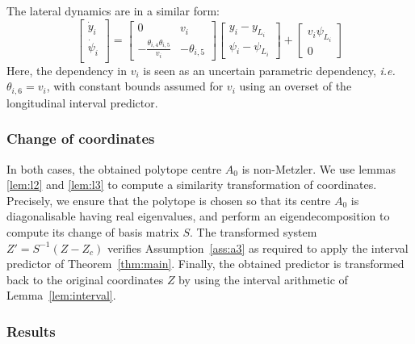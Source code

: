 The lateral dynamics are in a similar form:
\begin{equation*}
\begin{bmatrix}
\dot{y}_i \\
\dot{\psi}_i \\
\end{bmatrix}
=
\begin{bmatrix}
0 & v_i \\
-\frac{\theta_{i,4} \theta_{i,5}}{v_i} & -\theta_{i,5}
\end{bmatrix}
\begin{bmatrix}
y_i - y_{L_i} \\
\psi_i - \psi_{L_i}
\end{bmatrix}
+
\begin{bmatrix}
v_i\psi_{L_i} \\
0
\end{bmatrix}
\end{equation*}
Here, the dependency in $v_i$ is seen as an uncertain parametric dependency, \emph{i.e.} $\theta_{i,6}=v_i$, with constant bounds assumed for $v_i$ using an overset of the longitudinal interval predictor.

\subsubsection{Change of coordinates}
In both cases, the obtained polytope centre $A_0$ is non-Metzler.
We use lemmas \ref{lem:l2} and \ref{lem:l3} to compute a similarity transformation of coordinates. Precisely, we ensure that the polytope is chosen so that its centre $A_0$ is diagonalisable having real eigenvalues, and perform an eigendecomposition to compute its change of basis matrix $S$. The transformed system $Z'=S^{-1}(Z-Z_c)$ verifies Assumption~\ref{ass:a3} as required to apply the interval predictor of Theorem~\ref{thm:main}. Finally, the obtained predictor is transformed back to the original coordinates $Z$ by using the interval arithmetic of Lemma~\ref{lem:interval}.

\subsubsection{Results}

